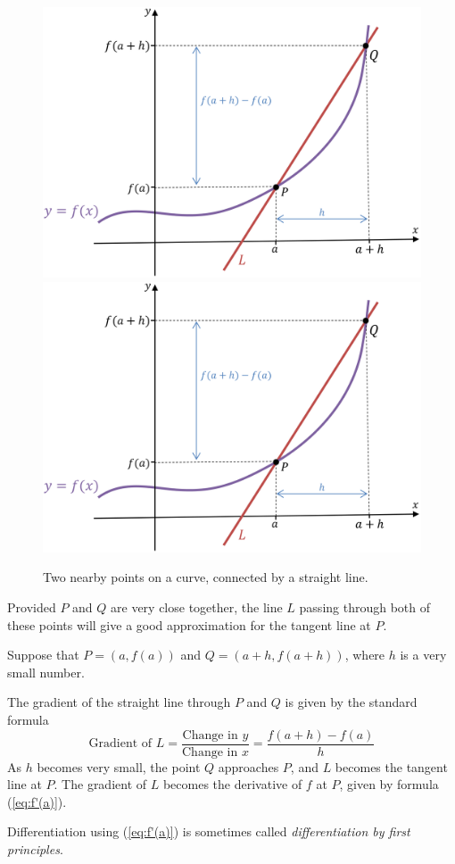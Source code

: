 \documentclass[12pt]{article}
\theoremstyle{definition} %
\begin{document}
\begin{figure}[H]
\centering
\iflatexml
\includegraphics[width=1\linewidth]{f'(a)}
\else
\includegraphics[width=.65\linewidth] {f'(a)} 
\fi
\caption{Two nearby points on a curve, connected by a straight line.}
\end{figure}

Provided $P$ and $Q$ are very close together, the line $L$ passing through both of these points will give a good approximation for the tangent line at $P$.

Suppose that $P=(a,f(a))$ and $Q = (a+h,f(a+h))$, where $h$ is a very small number.

The gradient of the straight line through $P$ and $Q$ is given by the standard formula
	\[\text{Gradient of } L = \frac{\text{Change in }y}{\text{Change in }x} = \frac{f(a+h)-f(a)}{h}\]
As $h$ becomes very small, the point $Q$ approaches $P$, and $L$ becomes the tangent line at $P$. The gradient of $L$ becomes the derivative of $f$ at $P$, given by formula (\ref{eq:f'(a)}). 

Differentiation using (\ref{eq:f'(a)}) is sometimes called \emph{differentiation by first principles}.
\end{document}
